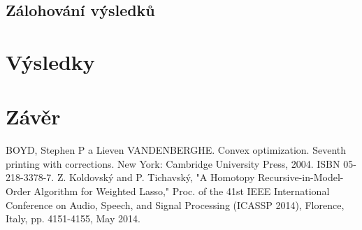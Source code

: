 \documentclass[FM,BP]{tulthesis}
\begin{document}
\section{Zálohování výsledků}
\chapter{Výsledky}
\label{ch:vysledky}

\chapter{Závěr}
\label{ch:end}

\renewcommand{\bibname}{Seznam použité literatury}
\begin{thebibliography}{99}
 BOYD, Stephen P a Lieven VANDENBERGHE. Convex optimization. Seventh printing with corrections. New York: Cambridge University Press, 2004. ISBN 05-218-3378-7.
Z. Koldovský and P. Tichavský, "A Homotopy Recursive-in-Model-Order Algorithm for Weighted Lasso," Proc. of the 41st IEEE International Conference on Audio, Speech, and Signal Processing (ICASSP 2014), Florence, Italy, pp. 4151-4155, May 2014.
\end{thebibliography}
\end{document}
